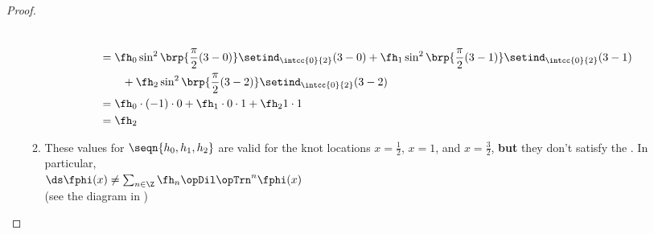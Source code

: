 \begin{proof}
\begin{enumerate}
\begin{enumerate}
\begin{align*}
          \\&=\fh_0 \sin^2\brp{\frac{\pi}{2}(3-0)}\setind_\intcc{0}{2}(3-0)
             +\fh_1 \sin^2\brp{\frac{\pi}{2}(3-1)}\setind_\intcc{0}{2}(3-1)
             \\&\qquad+\fh_2 \sin^2\brp{\frac{\pi}{2}(3-2)}\setind_\intcc{0}{2}(3-2)
          \\&=\fh_0 \cdot(-1)\cdot0
             +\fh_1 \cdot0\cdot1
             +\fh_2 1\cdot1
          \\&=\fh_2
        \end{align*}
      \item These values for $\seqn{h_0,h_1,h_2}$ are valid for the knot locations $x=\frac{1}{2}$, $x=1$, and $x=\frac{3}{2}$, 
            \textbf{but} they don't satisfy the  . In particular,
            \\\indentx$\ds\fphi(x) \neq \sum_{n\in\Z}\fh_n \opDil\opTrn^n \fphi(x)$
            \\(see the diagram in )
    \end{enumerate}
\end{enumerate}
\end{proof}



